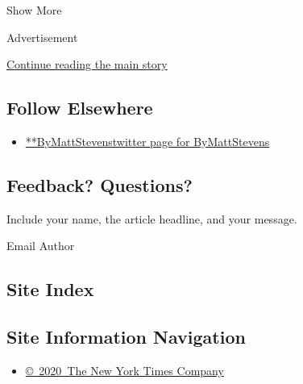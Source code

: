 Show More

Advertisement

\protect\hyperlink{after-mid2}{Continue reading the main story}

\hypertarget{follow-elsewhere}{%
\subsection{Follow Elsewhere}\label{follow-elsewhere}}

\begin{itemize}
\tightlist
\item
  \href{https://twitter.com/ByMattStevens}{**ByMattStevenstwitter page
  for ByMattStevens}
\end{itemize}

\hypertarget{feedback-questions}{%
\subsection{Feedback? Questions?}\label{feedback-questions}}

Include your name, the article headline, and your message.

Email Author

\hypertarget{site-index}{%
\subsection{Site Index}\label{site-index}}

\hypertarget{site-information-navigation}{%
\subsection{Site Information
Navigation}\label{site-information-navigation}}

\begin{itemize}
\tightlist
\item
  \href{https://help.nytimes.com/hc/en-us/articles/115014792127-Copyright-notice}{©~2020~The
  New York Times Company}
\end{itemize}


